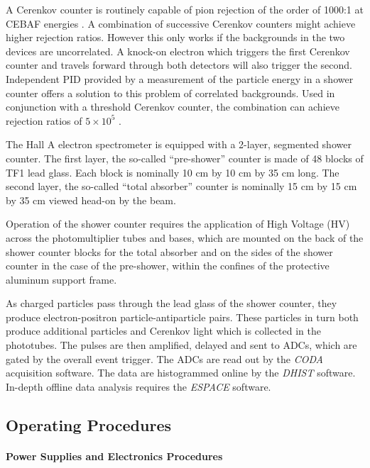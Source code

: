 A Cerenkov counter is routinely capable of pion rejection 
of the order of 1000:1 at CEBAF energies \cite{ferbel}.  A combination of
successive Cerenkov counters might achieve higher rejection ratios.  
However this only works if the backgrounds in the two devices are 
uncorrelated.  A knock-on electron which triggers 
the first Cerenkov counter and travels forward through both detectors 
will also trigger the second.  Independent PID provided by a measurement 
of the particle energy in a shower counter offers a solution to this 
problem of correlated backgrounds.  Used in conjunction with a threshold 
Cerenkov counter, the combination can achieve rejection ratios of 
$5\times 10^5$ \cite{CDR}.

The Hall A electron spectrometer is equipped with a 2-layer, segmented
shower counter.  The first layer, the so-called ``pre-shower'' counter
is made of 48 blocks of TF1 lead glass.  Each block is nominally
10 cm by
10 cm by 35 cm long.  The second layer, the so-called ``total absorber'' 
counter is nominally 15 cm by 15 cm by 35 cm viewed head-on by the beam.

Operation of the shower counter requires the application of High Voltage
(HV) across the photomultiplier tubes and bases, which are mounted on the
back of the shower counter blocks for the total absorber and on the sides 
of the shower counter in the case of the pre-shower, within the confines of 
the protective aluminum support frame.

As charged particles pass through the lead glass of the shower counter, they
produce electron-positron particle-antiparticle pairs.  These particles in 
turn both produce additional particles and Cerenkov light which is collected 
in the phototubes.  The pulses are then amplified, delayed and sent to
ADCs, which are gated by the overall event trigger.  The ADCs are read out 
by the {\it CODA} acquisition software.  The data are histogrammed online by 
the {\it DHIST} software.  In-depth offline data analysis requires the 
{\it ESPACE} software.

\subsection{Operating Procedures}

\paragraph{Power Supplies and Electronics Procedures}

